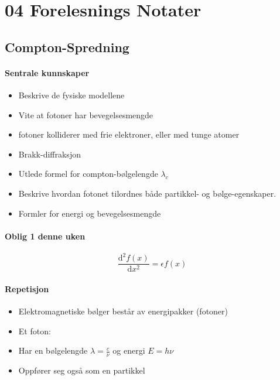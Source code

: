 \section{04 Forelesnings Notater}
\subsection{Compton-Spredning}
\paragraph{Sentrale kunnskaper}
\begin{itemize}
    \item Beskrive de fysiske modellene
    \item Vite at fotoner har bevegelsesmengde
    \item fotoner kolliderer med frie elektroner, eller med tunge atomer 
    \item Brakk-diffraksjon
    \item Utlede formel for compton-bølgelengde $λ_c$
    \item Beskrive hvordan fotonet tilordnes både partikkel- og bølge-egenskaper. 
    \item Formler for energi og bevegelsesmengde 
\end{itemize}

\paragraph*{Oblig 1 denne uken}
\[
\frac{\mathrm{d}^{2}f(x)}{\mathrm{d}x^{2}} = ϵ f(x)
\]
\paragraph*{Repetisjon}
\begin{itemize}
    \item Elektromagnetiske bølger består av energipakker (fotoner)
    \item 
    Et foton:
    \item Har en bølgelengde $λ = \frac{c}{ν}$ og energi $E = hν$
    \item Oppfører seg også som en partikkel
\end{itemize}
  
  
